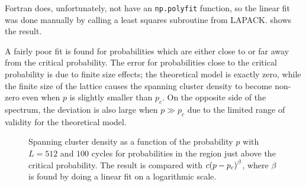 \documentclass[11pt,british,a4paper]{report}
\begin{document}
Fortran does, unfortunately, not have an \lstinline{np.polyfit} function, so the linear fit was done manually by calling a least squares subroutine from LAPACK.\@ {} shows the result.

A fairly poor fit is found for probabilities which are either close to or far away from the critical probability. The error for probabilities close to the critical probability is due to finite size effects; the theoretical model is exactly zero, while the finite size of the lattice causes the spanning cluster density to become non-zero even when \(p\) is slightly smaller than \(p_c\). On the opposite side of the spectrum, the deviation is also large when \(p\gg p_c\) due to the limited range of validity for the theoretical model.

\begin{figure}[htb]
    \centering
    \caption{Spanning cluster density as a function of the probability \(p\) with \(L=\num{512}\) and \(\num{100}\) cycles for probabilities in the region just above the critical probability. The result is compared with \(c\qty(p-p_c)^\beta\), where \(\beta\) is found by doing a linear fit on a logarithmic scale. }%
    \label{fig:cP}
\end{figure}


%
\end{document}
